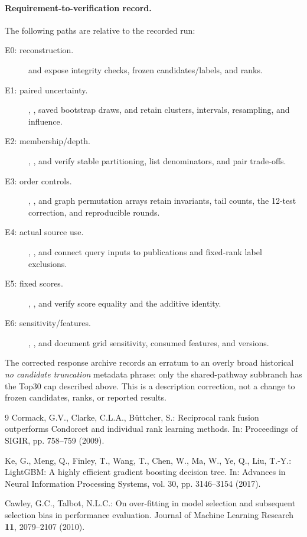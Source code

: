 \documentclass[runningheads]{llncs}
\begin{document}
\paragraph{Requirement-to-verification record.}
The following paths are relative to the recorded run:
\begingroup\small\raggedright
\begin{description}
\item[E0: reconstruction.]  and  expose integrity checks, frozen candidates/labels, and ranks.
\item[E1: paired uncertainty.] , , saved bootstrap draws, and  retain clusters, intervals, resampling, and influence.
\item[E2: membership/depth.] , , and  verify stable partitioning, list denominators, and pair trade-offs.
\item[E3: order controls.] , , and graph permutation arrays retain invariants, tail counts, the 12-test correction, and reproducible rounds.
\item[E4: actual source use.] , , and  connect query inputs to publications and fixed-rank label exclusions.
\item[E5: fixed scores.] , , and  verify score equality and the additive identity.
\item[E6: sensitivity/features.] , , and  document grid sensitivity, consumed features, and versions.
\end{description}
\endgroup
The corrected response archive records an erratum to an overly broad historical \emph{no candidate truncation} metadata phrase: only the shared-pathway subbranch has the Top30 cap described above. This is a description correction, not a change to frozen candidates, ranks, or reported results.

\begin{thebibliography}{9}
Cormack, G.V., Clarke, C.L.A., B\"uttcher, S.:
Reciprocal rank fusion outperforms Condorcet and individual rank learning methods.
In: Proceedings of SIGIR, pp. 758--759 (2009).

Ke, G., Meng, Q., Finley, T., Wang, T., Chen, W., Ma, W., Ye, Q., Liu, T.-Y.:
LightGBM: A highly efficient gradient boosting decision tree.
In: Advances in Neural Information Processing Systems, vol. 30, pp. 3146--3154 (2017).

Cawley, G.C., Talbot, N.L.C.:
On over-fitting in model selection and subsequent selection bias in performance evaluation.
Journal of Machine Learning Research \textbf{11}, 2079--2107 (2010).
\end{thebibliography}
\end{document}
